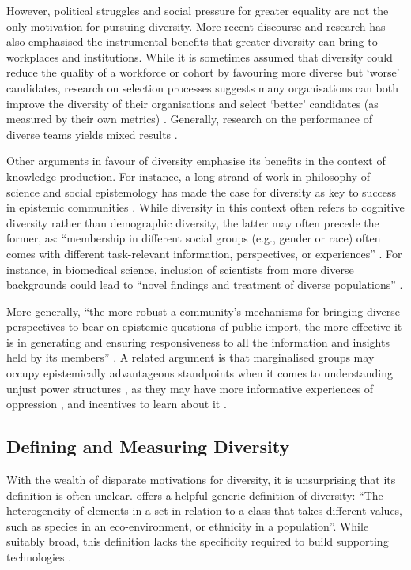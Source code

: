 However, political struggles and social pressure for greater equality are not the only motivation for pursuing diversity. More recent discourse and research has also emphasised the instrumental benefits that greater diversity can bring to workplaces and institutions. While it is sometimes assumed that diversity could reduce the quality of a workforce or cohort by favouring more diverse but `worse' candidates, research on selection processes suggests many organisations can both improve the diversity of their organisations and select `better' candidates (as measured by their own metrics) \cite{autor2008does,noray2023systemic}. Generally, research on the performance of diverse teams yields mixed results \cite{daubner2017dovetailing,page_diversity_2017,noray2023systemic,muller_learning_2019}.

Other arguments in favour of diversity emphasise its benefits in the context of knowledge production. For instance, a long strand of work in philosophy of science and social epistemology has made the case for diversity as key to success in epistemic communities \cite{mill1998liberty,merton1942note,wylie2006introduction}. While diversity in this context often refers to cognitive diversity rather than demographic diversity, the latter may often precede the former, as: ``membership in different social groups (e.g., gender or race) often comes with different task-relevant information, perspectives, or experiences'' \cite{peters2021hidden}. For instance, in biomedical science, inclusion of scientists from more diverse backgrounds could lead to ``novel findings and treatment of diverse populations'' \cite{swartz2019science}.

More generally, ``the more robust a community’s mechanisms for bringing diverse perspectives to bear on epistemic questions of public import, the more effective it is in generating and ensuring responsiveness to all the information and insights held by its members'' \cite{wylie2006introduction}. A related argument is that marginalised groups may occupy epistemically advantageous standpoints when it comes to understanding unjust power structures \cite{harding2004feminist,dror2023there,steel_multiple_2018}, as they may have more informative experiences of oppression \cite{mills2015blackness}, and incentives to learn about it \cite{jaggar1983feminist}.

\subsection{Defining and Measuring Diversity}
With the wealth of disparate motivations for diversity, it is unsurprising that its definition is often unclear. \textcite{page_diversity_2010} offers a helpful generic definition of diversity: ``The heterogeneity of elements in a set in relation to a class that takes different values, such as species in an eco-environment, or ethnicity in a population''. While suitably broad, this definition lacks the specificity required to build supporting technologies \cite{hupont2021diverse,page_diversity_2010}. 

